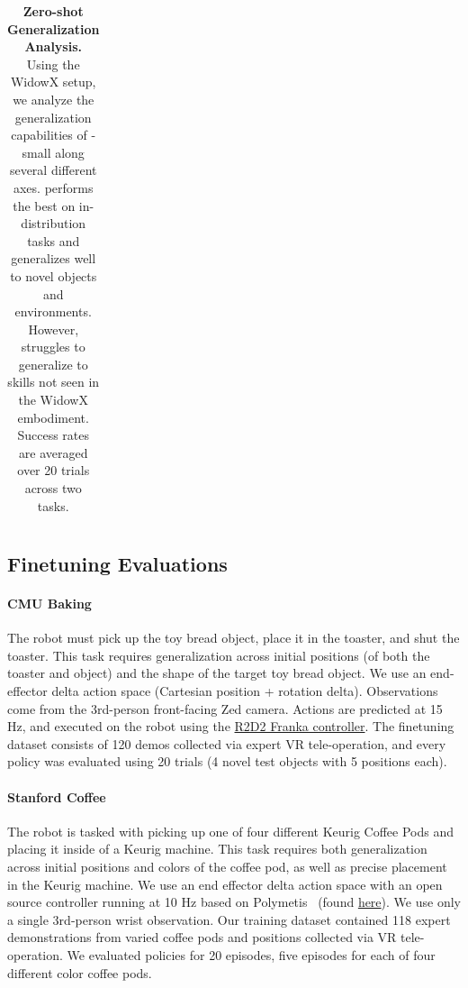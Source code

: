 \begin{appendices}
\begin{table}
{\begin{tabular}{cccc}
\end{tabular}}

\caption{\textbf{Zero-shot Generalization Analysis.} Using the WidowX setup, we analyze the generalization capabilities of \method-small along several different axes. \method{} performs the best on in-distribution tasks and generalizes well to novel objects and environments. However, \method{} struggles to generalize to skills not seen in the WidowX embodiment. Success rates are averaged over 20 trials across two tasks.}
\label{tab:gen-type}
\end{table}

\subsection{Finetuning Evaluations}
\paragraph{CMU Baking} The robot must pick up the toy bread object, place it in the toaster, and shut the toaster. This task requires generalization across initial positions (of both the toaster and object) and the shape of the target toy bread object. We use an end-effector delta action space (Cartesian position + rotation delta). Observations come from the 3rd-person front-facing Zed camera. Actions are predicted at 15 Hz, and executed on the robot using the \href{https://github.com/AlexanderKhazatsky/R2D2}{R2D2 Franka controller}. The finetuning dataset consists of 120 demos collected via expert VR tele-operation, and every policy was evaluated using 20 trials (4 novel test objects with 5 positions each). 

\paragraph{Stanford Coffee} The robot is tasked with picking up one of four different Keurig Coffee Pods and placing it inside of a Keurig machine. This task requires both generalization across initial positions and colors of the coffee pod, as well as precise placement in the Keurig machine. We use an end effector delta action space with an open source controller running at 10 Hz based on Polymetis~\citep{Polymetis2021} (found \href{https://github.com/jhejna/robot-lightning}{here}). We use only a single 3rd-person wrist observation. Our training dataset contained 118 expert demonstrations from varied coffee pods and positions collected via VR tele-operation. We evaluated policies for 20 episodes, five episodes for each of four different color coffee pods.


\end{appendices}
